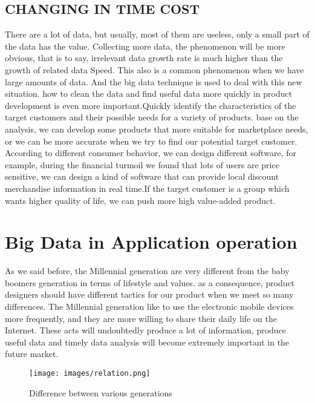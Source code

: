 \documentclass[sigconf]{acmart}
\begin{document}
\subsection{CHANGING IN TIME COST}
There are a lot of data, but usually, most of them are useless, only a small part of the data has the value. Collecting more data, the phenomenon will be more obvious, that is to say, irrelevant data growth rate is much higher than the growth of related data Speed. This also is a common phenomenon when we have large amounts of data. And the big data technique is used to deal with this new situation.
how to clean the data and find useful data more quickly in product development is even more important.Quickly identify the characteristics of the target customers and their possible needs for a variety of products. base on the analysis, we can develop some products that more suitable for marketplace needs, or we can be more accurate when we try to find our potential target customer. According to different consumer behavior, we can design different software, for example, during the financial turmoil we found that lots of users are price sensitive, we can design a kind of software that can provide local discount merchandise information in real time.If the target customer is a group which wants higher quality of life, we can push more high value-added product.
\section{Big Data in Application operation}
As we said before, the Millennial generation are very different from the baby boomers generation in terms of lifestyle and values. as a consequence, product designers should have different tactics for our product when we meet so many differences. The Millennial generation like to use the electronic mobile devices more frequently, and they are more willing to share their daily life on the Internet. These acts will undoubtedly produce a lot of information, produce useful data and timely data analysis will become extremely important in the future market.
\begin{figure}[!ht]
  \centering\texttt{[image: images/relation.png]}
  \caption{Difference between various generations \cite{part-reg}}
  \label{Figure 1}
\end{figure}
\end{document}
